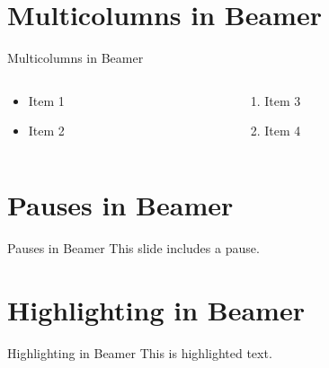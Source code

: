 \documentclass[aspectratio=43]{beamer}
\begin{document}
\section{Multicolumns in Beamer}
\begin{frame}{Multicolumns in Beamer}
  \begin{columns}[T] %
    \begin{column}{.5\textwidth}
      \begin{itemize}
        \item Item 1
        \item Item 2
      \end{itemize}
    \end{column}
    \begin{column}{.5\textwidth}
      \begin{enumerate}
        \item Item 3
        \item Item 4
      \end{enumerate}
    \end{column}
  \end{columns}
\end{frame}

\section{Pauses in Beamer}
\begin{frame}{Pauses in Beamer}
    This slide includes \pause a pause.
\end{frame}

\section{Highlighting in Beamer}
\begin{frame}{Highlighting in Beamer}
  This is \alert{highlighted} text.
\end{frame}

\end{document}
